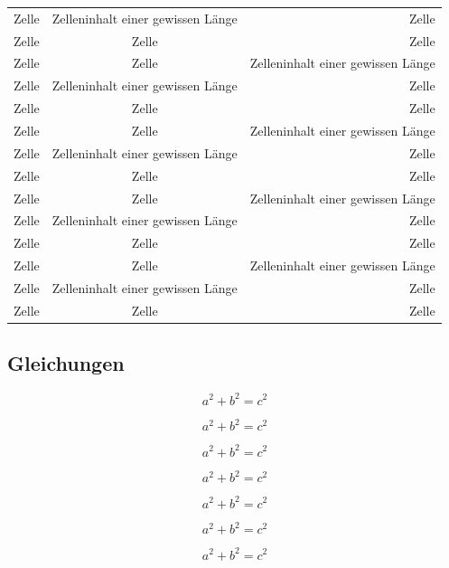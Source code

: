 \documentclass[ngerman]{scrartcl}
\begin{document}
\begin{longtabu}[l]{@{}lcr@{}}
		Zelle & Zelleninhalt einer gewissen Länge & Zelle\\
		Zelle & Zelle & Zelle\\
		Zelle & Zelle & Zelleninhalt einer gewissen Länge\\
		Zelle & Zelleninhalt einer gewissen Länge & Zelle\\
		Zelle & Zelle & Zelle\\
		Zelle & Zelle & Zelleninhalt einer gewissen Länge\\
		Zelle & Zelleninhalt einer gewissen Länge & Zelle\\
		Zelle & Zelle & Zelle\\
		Zelle & Zelle & Zelleninhalt einer gewissen Länge\\
		Zelle & Zelleninhalt einer gewissen Länge & Zelle\\
		Zelle & Zelle & Zelle\\
		Zelle & Zelle & Zelleninhalt einer gewissen Länge\\
		Zelle & Zelleninhalt einer gewissen Länge & Zelle\\
		Zelle & Zelle & Zelle\\
		\bottomrule
	\end{longtabu}


	\subsection{Gleichungen}

	\begin{equation}
		a^2+b^2=c^2 \label{eqn:eqn}
	\end{equation}

	\begin{equation}
		a^2+b^2=c^2
	\end{equation}

	\begin{equation}
		a^2+b^2=c^2
	\end{equation}

	\begin{equation}
		a^2+b^2=c^2
	\end{equation}

	\begin{equation}
		a^2+b^2=c^2
	\end{equation}

	\begin{equation}
		a^2+b^2=c^2
	\end{equation}

	\begin{equation}
		a^2+b^2=c^2
	\end{equation}
\end{document}

